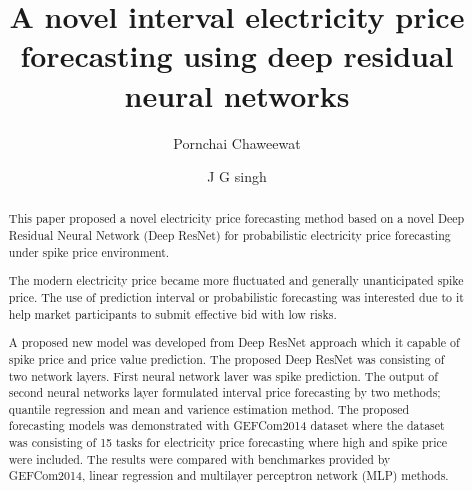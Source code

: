 \documentclass[review]{elsarticle}
\begin{document}
  \begin{frontmatter}

    \title{A novel interval electricity price forecasting using deep residual neural networks}

    \author{Pornchai Chaweewat}
    \author{J G singh}

    \address{Department of Energy, Environmental and Climate Change, School of Environmental, Resource and Development, Asian Institute of Thechnology, Thailand}


    \begin{abstract}
      This paper proposed a novel electricity price forecasting method based on a novel Deep Residual Neural Network (Deep ResNet) for probabilistic electricity price forecasting under spike price environment.

      The modern electricity price became more fluctuated and generally unanticipated spike price.
      The use of prediction interval or probabilistic forecasting was interested due to it help market participants to submit effective bid with low risks.

      A proposed new model was developed from Deep ResNet approach which it capable of spike price and price value prediction.
      The proposed Deep ResNet was consisting of two network layers.
      First neural network laver was spike prediction.
      The output of second neural networks layer formulated interval price forecasting by two methods; quantile regression and mean and varience estimation method.
      The proposed forecasting models was demonstrated with GEFCom2014 dataset where the dataset was consisting of 15 tasks for electricity price forecasting where high and spike price were included.
      The results were compared with benchmarkes provided by GEFCom2014, linear regression and multilayer perceptron network (MLP) methods.


\end{abstract}
\end{frontmatter}
\end{document}
